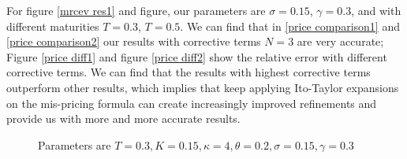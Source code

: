 For figure \ref{mrcev res1} and figure, our parameters are $\sigma=0.15$, $\gamma=0.3$, and with different maturities $T=0.3$, $T=0.5$. We can find that in \ref{price comparison1} and \ref{price comparison2} our results with corrective terms $N=3$ are very accurate; Figure \ref{price diff1} and figure \ref{price diff2} show the relative error with different corrective terms. We can find that the results with highest corrective terms outperform other results, which implies that keep applying Ito-Taylor expansions on the mis-pricing formula can create increasingly improved refinements and provide us with more and more accurate results.

\begin{figure}[ht]
    \centering
    \hfill
    \caption{Parameters are $T=0.3,K=0.15, \kappa=4,\theta=0.2, \sigma=0.15, \gamma=0.3$}
  \end{figure}\label{mrcev res1}

